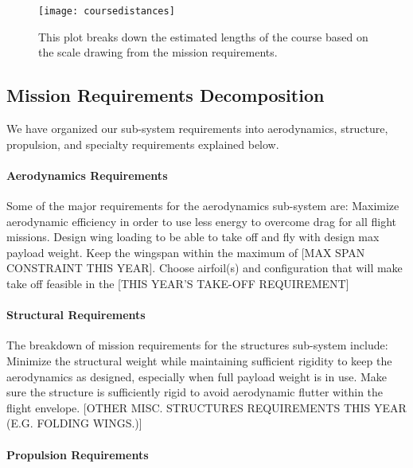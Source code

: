 \documentclass[report]{byu-aero}
\begin{document}
\begin{figure}[h!]
	\centering
	\texttt{[image: coursedistances]}
	\caption{This plot breaks down the estimated lengths of the course based on the scale drawing from the mission requirements.}
	\label{fig:course}
\end{figure}

\subsection{Mission Requirements Decomposition}
\label{ssec:MissionReqs}

We have organized our sub-system requirements into aerodynamics, structure, propulsion, and specialty requirements explained below.

\paragraph{Aerodynamics Requirements}
\label{sssec:AerodynamicReqs}

Some of the major requirements for the aerodynamics sub-system are: Maximize aerodynamic efficiency in order to use less energy to overcome drag for all flight missions.  Design wing loading to be able to take off and fly with design max payload weight.  Keep the wingspan within the maximum of {\color{BYUred}[MAX SPAN CONSTRAINT THIS YEAR]}.  Choose airfoil(s) and configuration that will make take off feasible in the {\color{BYUred}[THIS YEAR'S TAKE-OFF REQUIREMENT]}

\paragraph{Structural Requirements}
\label{sssec:StructuralReqs}

The breakdown of mission requirements for the structures sub-system include: Minimize the structural weight while maintaining sufficient rigidity to keep the aerodynamics as designed, especially when full payload weight is in use.  Make sure the structure is sufficiently rigid to avoid aerodynamic flutter within the flight envelope. {\color{BYUred}[OTHER MISC. STRUCTURES REQUIREMENTS THIS YEAR (E.G. FOLDING WINGS.)]}

\paragraph{Propulsion Requirements}
\label{sssec:PropulsionReqs}
\end{document}
